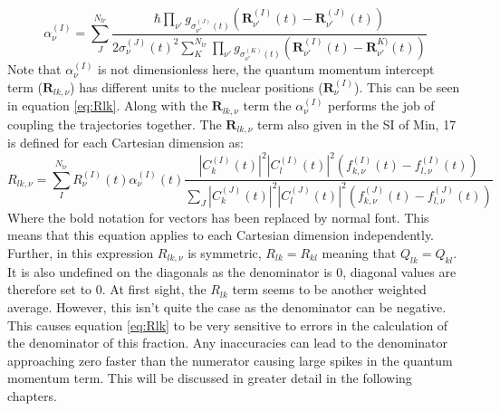 \begin{equation}
  \alpha_{\nu}^{(I)} = \sum_{J}^{N_{tr}} \frac{\hbar \prod_{\nu'} g_{\sigma_{\nu'}^{(J)}(t)}\left(\mathbf{R}_{\nu'}^{(I)}(t) -         \mathbf{R}_{\nu'}^{(J)}(t)\right)}   {2 \sigma_{\nu}^{(J)}(t)^2\sum_{K}^{N_{tr}}\prod_{\nu'}                                           g_{\sigma_{\nu'}^{(K)}(t)}\left(\mathbf{R}_{\nu'}^{(I)}(t) - \mathbf{R}_{\nu'}^{K)}(t)\right)}
  \label{eq:alpha}
\end{equation}
Note that $\alpha_{\nu}^{(I)}$ is not dimensionless here, the quantum momentum intercept term ($\mathbf{R}_{lk, \nu}$) has different units to the nuclear positions ($\mathbf{R}_{\nu}^{(I)}$). This can be seen in equation \eqref{eq:Rlk}.
Along with the $\mathbf{R}_{lk, \nu}$ term the $\alpha_{\nu}^{(I)}$ performs the job of coupling the trajectories together. The $\mathbf{R}_{lk, \nu}$ term also given in the SI of Min, 17\cite{min_ab_2017} is defined for each Cartesian dimension as:
\begin{equation}
  R_{lk, \nu} = \sum_{I}^{N_{tr}} R_{\nu}^{(I)}(t) \alpha_{\nu}^{(I)}(t) \frac{|C_{k}^{(I)}(t)|^2 |C_{l}^{(I)}(t)|^2 \left( f_{k,      \nu}^{(I)}(t) - f_{l, \nu}^{(I)}(t) \right)}{\sum_{J} |C_{k}^{(J)}(t)|^2 |C_{l}^{(J)}(t)|^2 \left( f_{k, \nu}^{(J)}(t) - f_{l,         \nu}^{(J)}(t) \right)}
  \label{eq:Rlk}
\end{equation}
Where the bold notation for vectors has been replaced by normal font. This means that this equation applies to each Cartesian dimension independently. Further, in this expression $R_{lk, \nu}$ is symmetric, $R_{lk} = R_{kl}$ meaning that $Q_{lk} = Q_{kl}$. It is also undefined on the diagonals as the denominator is 0, diagonal values are therefore set to 0. At first sight, the $R_{lk}$ term seems to be another weighted average. However, this isn't quite the case as the denominator can be negative. This causes equation \eqref{eq:Rlk} to be very sensitive to errors in the calculation of the denominator of this fraction. Any inaccuracies can lead to the denominator approaching zero faster than the numerator causing large spikes in the quantum momentum term. This will be discussed in greater detail in the following chapters.







